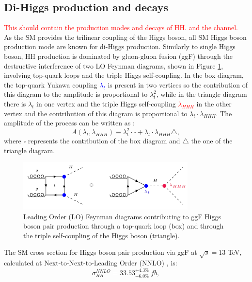 \subsection{Di-Higgs production and decays} 
\label{chap1:HH:HPD}
\textcolor{red}{This should contain the production modes and decays of HH. and the \HHyybb channel.
\\
}
As the SM provides the trilinear coupling of the Higgs boson, all SM Higgs boson production mode are known for di-Higgs production. Similarly to single Higgs boson, HH production is dominated by gluon-gluon fusion (ggF) through the destructive interference of two LO Feynman diagrams, shown in Figure \ref{fig:chap1:HH:HPD:FY}, involving top-quark loops and the triple Higgs self-coupling. In the box diagram, the top-quark Yukawa coupling \textcolor{blue}{$\lambda_t$} is present in two vertices so the contribution of this diagram to the amplitude is proportional to $\lambda_t^2$, while in the triangle diagram there is $\lambda_t$ in one vertex and the triple Higgs self-coupling \textcolor{red}{$\lambda_{HHH}$} in the other vertex and the contribution of this diagram is proportional to $\lambda_t\cdot\lambda_{HHH}$. The amplitude of the process can be written as :
\begin{equation}
    A(\lambda_t, \lambda_{HHH}) \equiv \lambda_t^2\cdot\square + \lambda_t\cdot\lambda_{HHH}\bigtriangleup,
\end{equation}
where $\square$ represents the contribution of the box diagram and $\bigtriangleup$ the one of the triangle diagram. 
\begin{figure}[htbp]
    \centering
    \includegraphics[width=0.8\textwidth]{Ch1/Img/HH_feyn.png}
    \caption{Leading Order (LO) Feynman diagrams contributing to ggF Higgs boson pair production through a top-quark loop (box) and through the triple self-coupling of the Higgs boson (triangle).}
    \label{fig:chap1:HH:HPD:FY}
\end{figure}
The SM cross section for Higgs boson pair production via ggF at $\sqrt{s}=13$ TeV, calculated at Next-to-Next-to-Leading Order (NNLO) \cite{HHXSec1, HHXSec2}, is:
\begin{equation}
    \sigma_{HH}^{NNLO} = 33.53_{-6.0\%}^{+4.3\%} \ fb,
    \label{eq:chap1:HH:XSEC:NNL0}
\end{equation}
